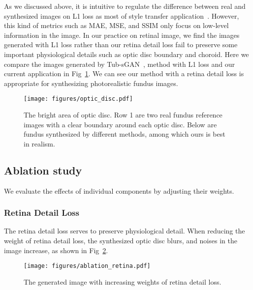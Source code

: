 \documentclass[letterpaper]{article} %
\begin{document}
    As we discussed above, it is intuitive to regulate the difference between real and synthesized images on L1 loss as most of style transfer application~\cite{DBLP:conf/cvpr/GatysEB16}. However, this kind of metrics such as MAE, MSE, and SSIM only focus on low-level information in the image. In our practice on retinal image, we find the images generated with L1 loss rather than our retina detail loss fail to preserve some important physiological details such as optic disc boundary and choroid. Here we compare the images generated by Tub-sGAN~\cite{zhao2018synthesizing}, method with L1  loss and our current application in Fig~\ref{fig:optic_disc}.   We can see our method with a retina detail loss is appropriate for synthesizing photorealistic fundus images.

	\begin{figure}[h!]
		\begin{center}
			\texttt{[image: figures/optic\_disc.pdf]}
		\end{center}
		\caption{The bright area of optic disc. Row 1 are two real fundus reference images with a clear boundary around each optic disc. Below are fundus synthesized by different methods, among which ours is best in realism. }
		\label{fig:optic_disc}
	\end{figure}

	\subsection{Ablation study}

    We evaluate the effects of individual components by adjusting their weights.


    \subsubsection{Retina Detail Loss}

	The retina detail loss serves to preserve physiological detail. When reducing the weight of retina detail loss, the synthesized optic disc blurs, and noises in the image increase, as shown in Fig~\ref{fig:ablation_retina}.

	\begin{figure}[t]
		\begin{center}
			\texttt{[image: figures/ablation\_retina.pdf]}
		\end{center}
		\caption{The generated image with increasing weights of retina detail loss.}
		\label{fig:ablation_retina}
	\end{figure}
\end{document}
